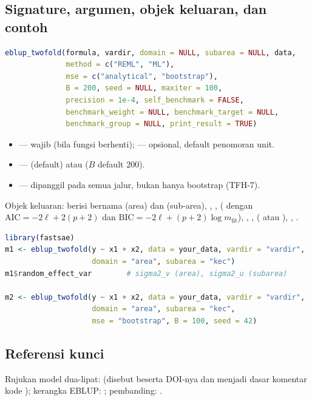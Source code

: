 \subsection{Signature, argumen, objek keluaran, dan contoh}\label{sec:twofold-api}

\begin{lstlisting}[language=R,caption={Signature \texttt{eblup\_twofold} (\texttt{R/eblup\_twofold.R:76-93}).}]
eblup_twofold(formula, vardir, domain = NULL, subarea = NULL, data,
              method = c("REML", "ML"),
              mse = c("analytical", "bootstrap"),
              B = 200, seed = NULL, maxiter = 100,
              precision = 1e-4, self_benchmark = FALSE,
              benchmark_weight = NULL, benchmark_target = NULL,
              benchmark_group = NULL, print_result = TRUE)
\end{lstlisting}

\begin{itemize}
  \item {} --- wajib (bila  fungsi berhenti);
         --- opsional, default penomoran unit.
  \item {} ---  (default) atau 
        ($B$ default 200).
  \item {} --- dipanggil pada semua jalur, bukan hanya bootstrap
        (TFH-7).
\end{itemize}

Objek keluaran:  berisi  bernama
 (area) dan  (sub-area), ,
,  ( dengan
$\mathrm{AIC}=-2\ell+2(p+2)$ dan $\mathrm{BIC}=-2\ell+(p+2)\log m_{\text{fit}}$),
, ,  ( atau ),
, .

\begin{lstlisting}[language=R,caption={Contoh yang dapat dijalankan (dari \texttt{man/eblup\_twofold.Rd}); membutuhkan kolom penanda area dan sub-area.}]
library(fastsae)
m1 <- eblup_twofold(y ~ x1 + x2, data = your_data, vardir = "vardir",
                    domain = "area", subarea = "kec")
m1$random_effect_var        # sigma2_v (area), sigma2_u (subarea)

m2 <- eblup_twofold(y ~ x1 + x2, data = your_data, vardir = "vardir",
                    domain = "area", subarea = "kec",
                    mse = "bootstrap", B = 100, seed = 42)
\end{lstlisting}

\subsection{Referensi kunci}\label{sec:twofold-ref}

Rujukan model dua-lipat: \citet{torabi2014small} (disebut
 beserta DOI-nya dan menjadi dasar komentar kode
); kerangka EBLUP: \citet{rao2015small};
pembanding:  \citep{molina2015sae}.
